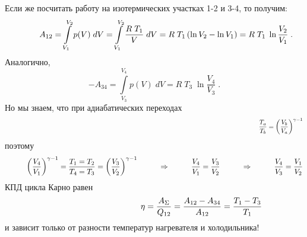 Если же посчитать работу на изотермических участках 1-2 и 3-4, то получим:\vspace{-5mm}
\begin{displaymath}
\hspace{10mm}A_{12}=\int\limits_{V_1}^{V_2}p(V)\;dV=
\int\limits_{V_1}^{V_2}\frac{R\;T_1}{V}\;dV=
R\;T_1\left(\ln V_2-\ln V_1\right)=
R\;T_1\;\ln \frac{V_2}{V_1}\;.
\end{displaymath}
Аналогично,\vspace{-5mm}
\begin{displaymath}
-A_{34}=\int\limits_{V_3}^{V_4}p(V)\;dV=
R\;T_3\;\ln \frac{V_4}{V_3}\;.
\end{displaymath}
Но мы знаем, что при адиабатических переходах\vspace{-14mm}
\begin{displaymath}
\hspace{140mm}\frac{T_a}{T_b}=\left(\frac{V_b}{V_a}\right)^{\gamma-1}
\end{displaymath}
поэтому
\begin{displaymath}
\hspace{10mm}\left(\frac{V_4}{V_1}\right)^{\gamma-1}=
\frac{T_1=T_2}{T_4=T_3}=\left(\frac{V_3}{V_2}\right)^{\gamma-1}
\hspace{10mm}\Rightarrow\hspace{10mm}\frac{V_4}{V_1}=\frac{V_3}{V_2}
\hspace{10mm}\Rightarrow\hspace{10mm}\frac{V_4}{V_3}=\frac{V_1}{V_2}
\end{displaymath}
КПД цикла Карно равен\vspace{-5mm}
\begin{displaymath}
\hspace{40mm}\eta=\frac{A_\Sigma}{Q_{12}}=\frac{A_{12}-A_{34}}{A_{12}}=\frac{T_1-T_3}{T_1}
\end{displaymath}
и зависит только от разности температур нагревателя и холодильника!\\

